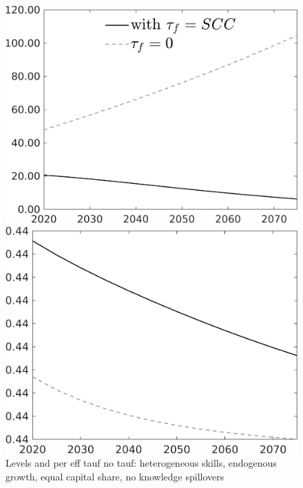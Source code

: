 \documentclass[12pt]{article}
\begin{document}
\begin{figure}[h!!]
	\centering
	\caption{Levels and per eff tauf no tauf: heterogeneous skills, endogenous growth, equal capital share, no knowledge spillovers}\label{fig:Leveltauf_nsk0_xgr0_equalcapShare_noknow_withtaul}
	\begin{minipage}[]{0.32\textwidth}
		\includegraphics[width=1\textwidth]{../../codding_model/own_basedOnFried/optimalPol_010922_revision/figures/all_13Sept22/LevTaufNoTauf_TaulCalib_Equlab_regime0_Emnet_spillover0_nsk0_xgr0_knspil1_sep1_LFlimit0_emsbase0_countec0_GovRev0_etaa0.79_lgd1.png}
	\end{minipage}	
	\begin{minipage}[]{0.32\textwidth}
		\includegraphics[width=1\textwidth]{../../codding_model/own_basedOnFried/optimalPol_010922_revision/figures/all_13Sept22/LevTaufNoTauf_TaulCalib_Equlab_regime0_hh_spillover0_nsk0_xgr0_knspil1_sep1_LFlimit0_emsbase0_countec0_GovRev0_etaa0.79_lgd0.png}

\end{minipage}
\end{figure}
\end{document}

